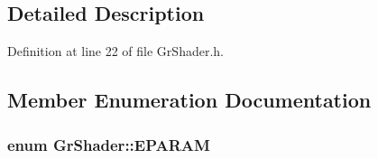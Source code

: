 \begin{CompactItemize}
\subsection{Detailed Description}


Definition at line 22 of file GrShader.h.

\subsection{Member Enumeration Documentation}
\hypertarget{class_gr_shader_2f004c603bb97711d05eb68381a5a7ba}{
\subsubsection[{EPARAM}]{\setlength{\rightskip}{0pt plus 5cm}enum {\bf GrShader::EPARAM}}}
\label{class_gr_shader_2f004c603bb97711d05eb68381a5a7ba}



\end{CompactItemize}
